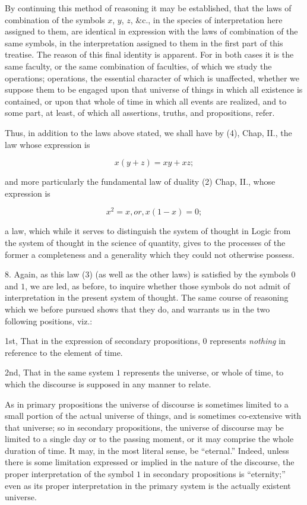 \documentclass[oneside]{book}
\begin{document}
By continuing this method of reasoning it may be established,
that the laws of combination of the symbols $x$, $y$, $z$, \&c., in the
species of interpretation here assigned to them, are identical in
expression with the laws of combination of the same symbols, in
the interpretation assigned to them in the first part of this
treatise. The reason of this final identity is apparent. For in
both cases it is the same faculty, or the same combination of
faculties, of which we study the operations; operations, the
essential character of which is unaffected, whether we suppose them to
be engaged upon that universe of things in which all existence
is contained, or upon that whole of time in which all events are
realized, and to some part, at least, of which all assertions,
truths, and propositions, refer.

Thus, in addition to the laws above stated, we shall have by
(4), Chap, II., the law whose expression is

\begin{equation}
x(y + z)=xy + xz;
\end{equation}

and more particularly the fundamental law of duality (2) Chap, II.,
whose expression is

\begin{equation}
x^2 = x, or, x (1 - x) = 0;
\end{equation}

a law, which while it serves to distinguish the system of thought
in Logic from the system of thought in the science of quantity,
gives to the processes of the former a completeness and a
generality which they could not otherwise possess.

8. Again, as this law (3) (as well as the other laws) is
satisfied by the symbols $0$ and $1$, we are led, as before, to inquire
whether those symbols do not admit of interpretation in the
present system of thought. The same course of reasoning which we
before pursued shows that they do, and warrants us in the two
following positions, viz.:

1st, That in the expression of secondary propositions, $0$
represents \textit{nothing} in reference to the element of time.

2nd, That in the same system $1$ represents the universe, or
whole of time, to which the discourse is supposed in any manner
to relate.

As in primary propositions the universe of discourse is
sometimes limited to a small portion of the actual universe of things,
and is sometimes co-extensive with that universe; so in secondary
propositions, the universe of discourse may be limited to a
single day or to the passing moment, or it may comprise the
whole duration of time. It may, in the most literal sense, be
``eternal.'' Indeed, unless there is some limitation expressed or
implied in the nature of the discourse, the proper interpretation
of the symbol $1$ in secondary propositions is ``eternity;'' even as
its proper interpretation in the primary system is the actually
existent universe.
\end{document}
